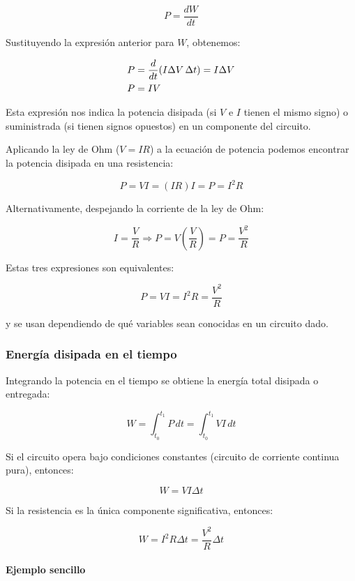 \[
P = \frac{dW}{dt}
\]

Sustituyendo la expresión anterior para \( W \), obtenemos:

\begin{align}
    P &= \frac{d}{dt}(I \Delta V \, \Delta t) = I \Delta V \notag \\
    P &= IV
\end{align}

Esta expresión nos indica la potencia disipada (si \( V \) e \( I \) tienen el mismo signo) o suministrada (si tienen signos opuestos) en un componente del circuito.

Aplicando la ley de Ohm (\( V = IR \)) a la ecuación de potencia podemos encontrar la potencia disipada en una resistencia:

\[
P = VI = (IR)I = \boxed{P = I^2 R}
\]

Alternativamente, despejando la corriente de la ley de Ohm:

\[
I = \frac{V}{R} \Rightarrow P = V \left( \frac{V}{R} \right) = \boxed{P = \frac{V^2}{R}}
\]

Estas tres expresiones son equivalentes:

\begin{equation}
    \boxed{P = VI = I^2 R = \frac{V^2}{R}}
    \label{eq:potencia_electrica}
\end{equation}

y se usan dependiendo de qué variables sean conocidas en un circuito dado.


\subsubsection{Energía disipada en el tiempo}

Integrando la potencia en el tiempo se obtiene la energía total disipada o entregada:

\[
W = \int_{t_0}^{t_1} P \, dt = \int_{t_0}^{t_1} VI \, dt
\]

Si el circuito opera bajo condiciones constantes (circuito de corriente continua pura), entonces:

\[
W = V I \Delta t
\]

Si la resistencia es la única componente significativa, entonces:

\[
W = I^2 R \Delta t = \frac{V^2}{R} \Delta t
\]


\paragraph{Ejemplo sencillo}

